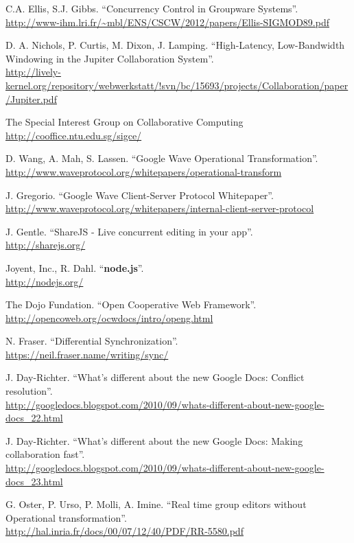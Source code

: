 \documentclass[a4paper, 12pt, twoside]{book}
\begin{document}
\begin{thebibliography}{99}

 C.A. Ellis, S.J. Gibbs. “Concurrency Control in Groupware Systems”.
\\\url{http://www-ihm.lri.fr/~mbl/ENS/CSCW/2012/papers/Ellis-SIGMOD89.pdf}

 D. A. Nichols, P. Curtis, M. Dixon, J. Lamping. “High-Latency, Low-Bandwidth Windowing in the Jupiter Collaboration System”.
\\\url{http://lively-kernel.org/repository/webwerkstatt/!svn/bc/15693/projects/Collaboration/paper/Jupiter.pdf}

 The Special Interest Group on Collaborative Computing
\\\url{http://cooffice.ntu.edu.sg/sigce/}

 D. Wang, A. Mah, S. Lassen. “Google Wave Operational Transformation”.
\\\url{http://www.waveprotocol.org/whitepapers/operational-transform}

 J. Gregorio. “Google Wave Client-Server Protocol Whitepaper”.
\\\url{http://www.waveprotocol.org/whitepapers/internal-client-server-protocol}

 J. Gentle. “ShareJS - Live concurrent editing in your app”.
\\\url{http://sharejs.org/}

 Joyent, Inc., R. Dahl. “\textbf{node.js}”.
\\\url{http://nodejs.org/}

 The Dojo Fundation. “Open Cooperative Web Framework”.
\\\url{http://opencoweb.org/ocwdocs/intro/openg.html}

 N. Fraser. “Differential Synchronization”.
\\\url{https://neil.fraser.name/writing/sync/}

 J. Day-Richter. “What’s different about the new Google Docs: Conflict resolution”.
\\\url{http://googledocs.blogspot.com/2010/09/whats-different-about-new-google-docs_22.html}

 J. Day-Richter. “What’s different about the new Google Docs: Making collaboration fast”.
\\\url{http://googledocs.blogspot.com/2010/09/whats-different-about-new-google-docs_23.html}

 G. Oster, P. Urso, P. Molli, A. Imine. “Real time group editors without Operational transformation”.
\\\url{http://hal.inria.fr/docs/00/07/12/40/PDF/RR-5580.pdf}

\end{thebibliography}

\end{document}
